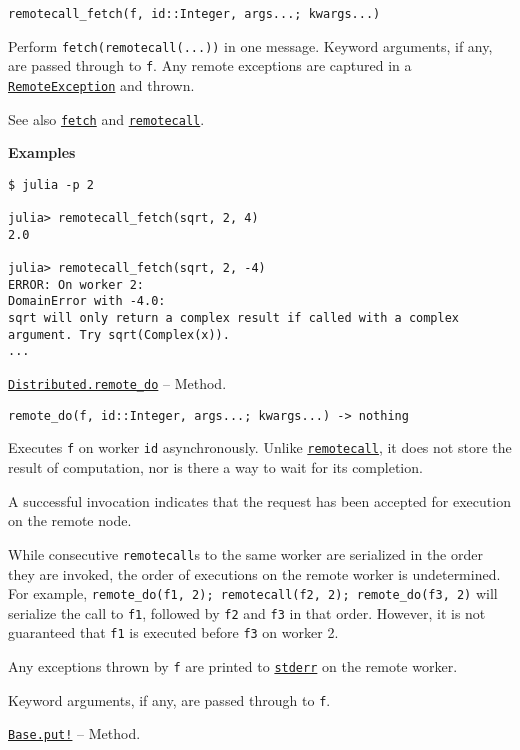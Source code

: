 \begin{adjustwidth}{2em}{0pt}


\begin{verbatim}
remotecall_fetch(f, id::Integer, args...; kwargs...)
\end{verbatim}

Perform \texttt{fetch(remotecall(...))} in one message. Keyword arguments, if any, are passed through to \texttt{f}. Any remote exceptions are captured in a \hyperlink{10250718604436154991}{\texttt{RemoteException}} and thrown.

See also \hyperlink{11007884648860062495}{\texttt{fetch}} and \hyperlink{16286103980815121272}{\texttt{remotecall}}.

\textbf{Examples}


\begin{verbatim}
$ julia -p 2

julia> remotecall_fetch(sqrt, 2, 4)
2.0

julia> remotecall_fetch(sqrt, 2, -4)
ERROR: On worker 2:
DomainError with -4.0:
sqrt will only return a complex result if called with a complex argument. Try sqrt(Complex(x)).
...
\end{verbatim}



\end{adjustwidth}
\hypertarget{10768474699483765487}{} 
\hyperlink{10768474699483765487}{\texttt{Distributed.remote\_do}}  -- {Method.}

\begin{adjustwidth}{2em}{0pt}


\begin{verbatim}
remote_do(f, id::Integer, args...; kwargs...) -> nothing
\end{verbatim}

Executes \texttt{f} on worker \texttt{id} asynchronously. Unlike \hyperlink{16286103980815121272}{\texttt{remotecall}}, it does not store the result of computation, nor is there a way to wait for its completion.

A successful invocation indicates that the request has been accepted for execution on the remote node.

While consecutive \texttt{remotecall}s to the same worker are serialized in the order they are invoked, the order of executions on the remote worker is undetermined. For example, \texttt{remote\_do(f1, 2); remotecall(f2, 2); remote\_do(f3, 2)} will serialize the call to \texttt{f1}, followed by \texttt{f2} and \texttt{f3} in that order. However, it is not guaranteed that \texttt{f1} is executed before \texttt{f3} on worker 2.

Any exceptions thrown by \texttt{f} are printed to \hyperlink{6150355911915549172}{\texttt{stderr}} on the remote worker.

Keyword arguments, if any, are passed through to \texttt{f}.



\end{adjustwidth}
\hypertarget{2834687666116026096}{} 
\hyperlink{2834687666116026096}{\texttt{Base.put!}}  -- {Method.}

